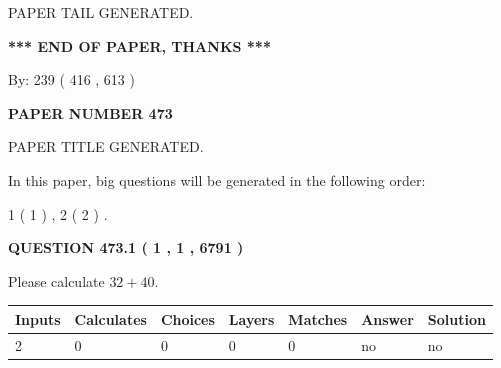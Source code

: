 \documentclass[12pt]{article}
\begin{document}
   
   
\vspace{2.0in} PAPER TAIL GENERATED.
   
   
   
   
\vspace{1.0in} 
{\textbf{\large{ *** END OF PAPER, THANKS *** }}} 
   
   
\hspace{1.0in} By: 
 239 ( 416 ,  613 )
   
   
   
   
\newpage 
\setcounter{page}{ 
   473001 } 
   
   
   
   
 {\textbf{ \Large{ PAPER NUMBER  473  }}}
   
   
\vspace{0.2in}
   
   
   
   
   
   
   
   
 \vspace{0.2in}
 
 
 
 
   
   
 PAPER TITLE GENERATED.
   
   
   
\vspace{0.2in}
   
In this paper, big questions will be generated in the following order: 
   
   
   1 ( 1 )
 ,
   2 ( 2 )
 .
  
\vspace{0.2in}
  
{\textbf{\Large{QUESTION
473.1 
 ( 1 , 1 , 6791 )
}}}
  
  
 
Please calculate $ %
32 +  %
40 $.
 
 
   
   
   
   
\noindent\begin{tabular}{|l|l|l|l|l|l|l|}
 \hline
Inputs & Calculates & Choices & Layers & Matches & Answer & Solution \\ \hline
 2  & 
 0  & 
 0
  & 
 0  & 
 0  & 
  no & 
  no 
  \\ \hline
 \end{tabular}
   
\end{document}
